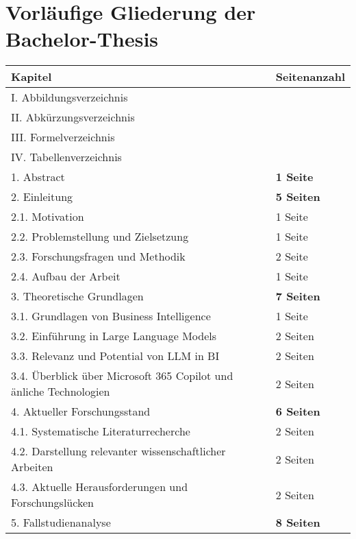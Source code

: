 
\section{Vorläufige Gliederung der Bachelor-Thesis}


\begin{longtable}{|p{6cm}|p{6cm}|}
    \hline
    \textbf{Kapitel} & \textbf{Seitenanzahl} \\
    \hline
    I.      Abbildungsverzeichnis \\
    \hline
    II.     Abkürzungsverzeichnis \\
    \hline
    III.    Formelverzeichnis\\
    \hline
    IV.     Tabellenverzeichnis\\
    \hline
    1.  Abstract & \textbf{1 Seite} \\
    \hline
    2.  Einleitung & \textbf{5 Seiten} \\
    \hline
        2.1. Motivation & 1 Seite \\
        \hline
        2.2. Problemstellung und Zielsetzung & 1 Seite \\
        \hline
        2.3. Forschungsfragen und Methodik & 2 Seite \\
        \hline
        2.4. Aufbau der Arbeit & 1 Seite \\
    \hline
    3.  Theoretische Grundlagen & \textbf{7 Seiten} \\
    \hline
        3.1. Grundlagen von Business Intelligence & 1 Seite \\
        \hline
        3.2. Einführung in Large Language Models & 2 Seiten \\
        \hline
        3.3. Relevanz und Potential von LLM in BI & 2 Seiten \\
        \hline
        3.4. Überblick über Microsoft 365 Copilot und änliche Technologien & 2 Seiten \\
    \hline
    4. Aktueller Forschungsstand & \textbf{6 Seiten} \\
    \hline
        4.1. Systematische Literaturrecherche & 2 Seiten \\
        \hline
        4.2. Darstellung relevanter wissenschaftlicher Arbeiten & 2 Seiten \\
        \hline
        4.3. Aktuelle Herausforderungen und Forschungslücken & 2 Seiten \\
    \hline
    5. Fallstudienanalyse & \textbf{8 Seiten} \\

\end{longtable}
